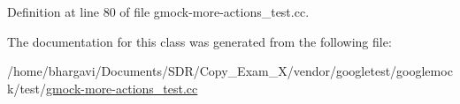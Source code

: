 Definition at line 80 of file gmock-\/more-\/actions\+\_\+test.\+cc.



The documentation for this class was generated from the following file\+:\begin{DoxyCompactItemize}
\item 
/home/bhargavi/\+Documents/\+S\+D\+R/\+Copy\+\_\+\+Exam\+\_\+X/vendor/googletest/googlemock/test/\hyperlink{gmock-more-actions__test_8cc}{gmock-\/more-\/actions\+\_\+test.\+cc}\end{DoxyCompactItemize}

